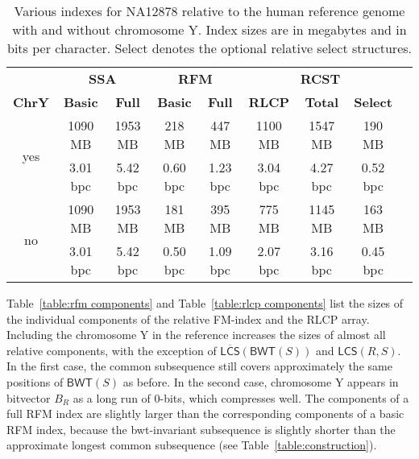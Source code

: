 \documentclass[a4paper,11pt]{llncs}
\renewcommand{\complement}[1]{\ensuremath{\overline{ #1 }}}
\newcommand{\RCST}{\textsf{RCST}}
\newcommand{\SSA}{\textsf{SSA}}
\newcommand{\RFM}{\textsf{RFM}}
\newcommand{\mBWT}{\ensuremath{\mathsf{BWT}}}
\newcommand{\RLCP}{\textsf{RLCP}}
\newcommand{\mLCS}{\ensuremath{\mathsf{LCS}}}
\newcommand{\mCS}{\ensuremath{\complement{\mathsf{LCS}}}}
\newcommand{\zerobit}{$0$\nobreakdash-bit}
\begin{document}
\begin{table}
\caption{Various indexes for NA12878 relative to the human reference genome with and without chromosome Y. Index sizes are in megabytes and in bits per character. Select denotes the optional relative select structures.}\label{table:indexes}
\setlength{\extrarowheight}{2pt}
\setlength{\tabcolsep}{3pt}
\begin{center}
\begin{tabular}{c|cc|cc|cccc}
\hline
 &
\multicolumn{2}{c|}{\textbf{\SSA}} &
\multicolumn{2}{c|}{\textbf{\RFM}} &
\multicolumn{3}{c}{\textbf{\RCST}} \\
\textbf{ChrY} &
\textbf{Basic} & \textbf{Full} &
\textbf{Basic} & \textbf{Full} &
\textbf{\RLCP} & \textbf{Total} & \textbf{Select} \\
\hline
\multirow{2}{*}{yes} &  1090 MB &  1953 MB &   218 MB &   447 MB &  1100 MB &  1547 MB &   190 MB \\
                     & 3.01 bpc & 5.42 bpc & 0.60 bpc & 1.23 bpc & 3.04 bpc & 4.27 bpc & 0.52 bpc \\
\hline
\multirow{2}{*}{no}  &  1090 MB &  1953 MB &   181 MB &   395 MB &   775 MB &  1145 MB &   163 MB \\
                     & 3.01 bpc & 5.42 bpc & 0.50 bpc & 1.09 bpc & 2.07 bpc & 3.16 bpc & 0.45 bpc \\
\hline
\end{tabular}
\end{center}
\end{table}

Table~\ref{table:rfm components} and Table~\ref{table:rlcp components} list the sizes of the individual components of the relative FM-index and the \RLCP{} array. Including the chromosome Y in the reference increases the sizes of almost all relative components, with the exception of $\mCS(\mBWT(S))$ and $\mLCS(R,S)$. In the first case, the common subsequence still covers approximately the same positions of $\mBWT(S)$ as before. In the second case, chromosome Y appears in bitvector $B_{R}$ as a long run of \zerobit{}s, which compresses well. The components of a full \RFM{} index are slightly larger than the corresponding components of a basic \RFM{} index, because the bwt-invariant subsequence is slightly shorter than the approximate longest common subsequence (see Table~\ref{table:construction}).
\end{document}
